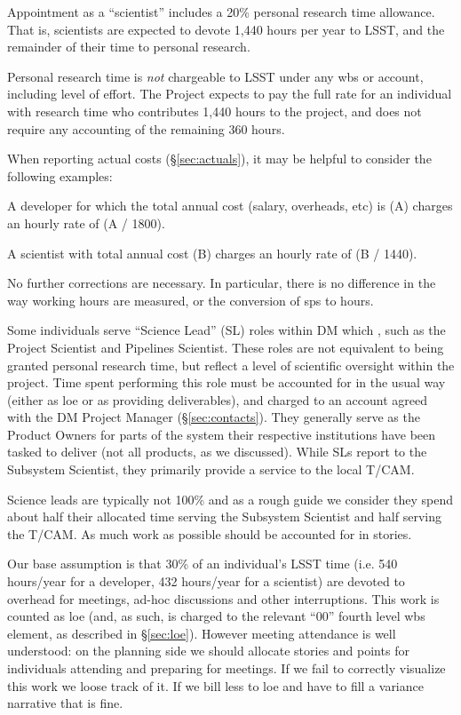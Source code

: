 Appointment as a ``scientist'' includes a 20\% personal research time
allowance. That is, scientists are expected to devote 1,440 hours per
year to LSST, and the remainder of their time to personal research.

Personal research time is \emph{not} chargeable to LSST under any \gls{wbs} or
account, including level of effort. The Project expects to pay the full
rate for an individual with research time who contributes 1,440 hours to
the project, and does not require any accounting of the remaining 360
hours.

When reporting actual costs (\S\ref{sec:actuals}), it may
be helpful to consider the following examples:

A developer for which the total annual cost (salary, overheads, etc) is
(A) charges an hourly rate of (A / 1800).

A scientist with total annual cost (B) charges an hourly rate of
(B / 1440).

No further corrections are necessary. In particular, there is no
difference in the way working hours are measured, or the conversion of
\glspl{sp} to hours.

Some individuals serve ``Science Lead'' (SL) roles within DM which ,
such as the Project Scientist and Pipelines Scientist. These roles are
not equivalent to being granted personal research time, but reflect a
level of scientific oversight within the project. Time spent performing
this role must be accounted for in the usual way (either as \gls{loe} or as
providing deliverables), and charged to an account agreed with the
DM Project Manager (\S\ref{sec:contacts}). They generally
serve as the Product Owners for parts of the system their respective
institutions have been tasked to deliver (not all products, as we
discussed). While SLs report to the Subsystem Scientist, they primarily
provide a service to the local T/CAM.

Science leads are typically not 100\% and as a rough guide we consider
they spend about half their allocated time serving the Subsystem
Scientist and half serving the T/CAM. As much work as possible should be
accounted for in stories.

Our base assumption is that 30\% of an individual's LSST time (i.e. 540 hours/year for a developer, 432 hours/year for a scientist) are devoted to overhead for meetings, ad-hoc discussions and other interruptions.
This work is counted as \gls{loe} (and, as such, is charged to the relevant ``00'' fourth level \gls{wbs} \gls{element}, as described in \S\ref{sec:loe}).
However meeting attendance is well understood:  on the planning side we should allocate stories and points for individuals attending and preparing for meetings.
If we fail to correctly visualize this work we loose track of it.
If we bill less to \gls{loe} and have to fill a variance narrative that is fine.

